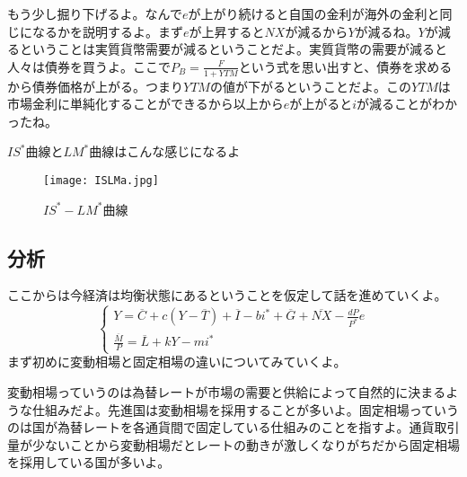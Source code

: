 \documentclass[a4paper, 12pt]{article}
\begin{document}
もう少し掘り下げるよ。なんで$e$が上がり続けると自国の金利が海外の金利と同じになるかを説明するよ。まず$e$が上昇すると$NX$が減るから$Y$が減るね。$Y$が減るということは実質貨幣需要が減るということだよ。実質貨幣の需要が減ると人々は債券を買うよ。ここで$P_B=\frac{F}{1+YTM}$という式を思い出すと、債券を求めるから債券価格が上がる。つまり$YTM$の値が下がるということだよ。この$YTM$は市場金利に単純化することができるから以上から$e$が上がると$i$が減ることがわかったね。

$IS^*$曲線と$LM^*$曲線はこんな感じになるよ
\begin{figure}[h]
\begin{center}
\texttt{[image: ISLMa.jpg]}
\caption{$IS^*-LM^*$曲線}
\label{}
\end{center}
\end{figure}

\subsection{分析}
ここからは今経済は均衡状態にあるということを仮定して話を進めていくよ。
\begin{displaymath}
  \left\{\begin{array}{l}
    \displaystyle Y = \overline{C}+c(Y-\overline{T})+\overline{I}-bi^*+\overline{G}+\overline{NX}-\frac{dP}{P^*}e\\
    \displaystyle \frac{\overline{M}}{P}=\overline{L}+kY-mi^*
  \end{array}\right.
\end{displaymath}
まず初めに変動相場と固定相場の違いについてみていくよ。

変動相場っていうのは為替レートが市場の需要と供給によって自然的に決まるような仕組みだよ。先進国は変動相場を採用することが多いよ。固定相場っていうのは国が為替レートを各通貨間で固定している仕組みのことを指すよ。通貨取引量が少ないことから変動相場だとレートの動きが激しくなりがちだから固定相場を採用している国が多いよ。
\end{document}

